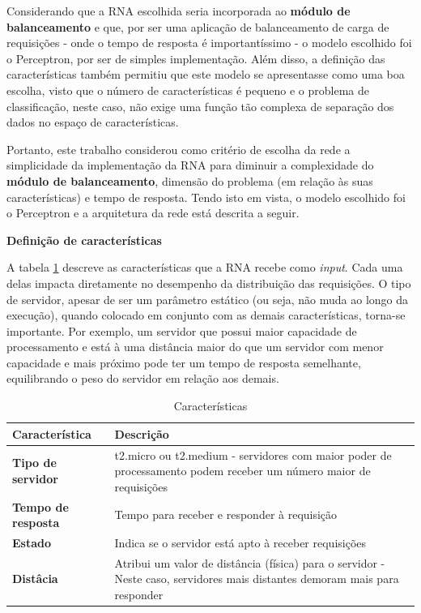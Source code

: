 Considerando que a RNA escolhida seria incorporada ao \textbf{módulo de balanceamento} e que, por ser uma aplicação de balanceamento de carga de requisições - onde o tempo de resposta é importantíssimo - o modelo escolhido foi o Perceptron, por ser de simples implementação. Além disso, a definição das características também permitiu que este modelo se apresentasse como uma boa escolha, visto que o número de características é pequeno e o problema de classificação, neste caso, não exige uma função tão complexa de separação dos dados no espaço de características. 

Portanto, este trabalho considerou como critério de escolha da rede a simplicidade da implementação da RNA para diminuir a complexidade do \textbf{módulo de balanceamento}, dimensão do problema (em relação às suas características) e tempo de resposta. Tendo isto em vista, o modelo escolhido foi o Perceptron e a arquitetura da rede está descrita a seguir. 

\textbf{Definição de características}

A tabela \ref{tab:caracteristicas} descreve as características que a RNA recebe como \textit{input}. Cada uma delas impacta diretamente no desempenho da distribuição das requisições. O tipo de servidor, apesar de ser um parâmetro estático (ou seja, não muda ao longo da execução), quando colocado em conjunto com as demais características, torna-se importante. Por exemplo, um servidor que possui maior capacidade de processamento e está à uma distância maior do que um servidor com menor capacidade e mais próximo pode ter um tempo de resposta semelhante, equilibrando o peso do servidor em relação aos demais. 

\begin{table}[h]
	\caption{Características}
	\centering
	\small
	\renewcommand{\arraystretch}{1.2} %
	\begin{tabular}{>{\centering\arraybackslash}m{3.5cm} m{11.5cm}}
		\hline 
		\textbf{Característica} & \textbf{Descrição}  \\ 
		\hline 
		\textbf{Tipo de servidor}& t2.micro ou t2.medium - servidores com maior poder de processamento podem receber um número maior de requisições \\ 
		\hline 
		\textbf{Tempo de resposta } & Tempo para receber e responder à requisição\\ 
		\hline 
		\textbf{Estado} & Indica se o servidor está apto à receber requisições\\ 
		\hline 
		\textbf{Distâcia} & Atribui um valor de distância (física) para o servidor - Neste caso, servidores mais distantes demoram mais para responder\\ 
		\hline 
	\end{tabular}\\
	\vspace{3mm}
	\label{tab:caracteristicas}
\end{table}

